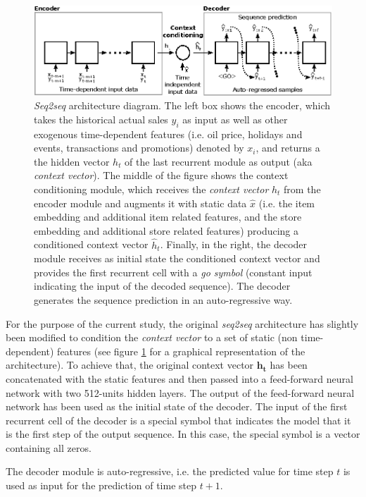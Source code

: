\documentclass{elsarticle}
\begin{document}
	\begin{figure}[h!]
		\centering
		\includegraphics[width=1\linewidth]{img/s2s}
		\caption{\textit{Seq2seq} architecture diagram. The left box shows the encoder, which takes the historical actual sales $y_i$ as input as well as other exogenous time-dependent features (i.e. oil price, holidays and events, transactions and promotions) denoted by $x_i$, and returns a the hidden vector $h_t$ of the last recurrent module as output (aka \textit{context vector}). The middle of the figure shows the context conditioning module, which receives the \textit{context vector} $h_t$ from the encoder module and augments it with static data $\hat{x}$ (i.e. the item embedding and additional item related features, and the store embedding and additional store related features) producing a conditioned context vector $\hat{h}_t$. Finally, in the right, the decoder module receives as initial state the conditioned context vector and provides the first recurrent cell with a \textit{go symbol} (constant input indicating the input of the decoded sequence). The decoder generates the sequence prediction in an auto-regressive way.}
		\label{fig:s2s}
	\end{figure}
	
   For the purpose of the current study, the original \textit{seq2seq} architecture has slightly been modified to condition the \textit{context vector} to a set of static (non time-dependent) features (see figure \ref{fig:s2s} for a graphical representation of the architecture). To achieve that, the original context vector $\mathbf{h_t}$ has been concatenated with the static features and then passed into a feed-forward neural network with two 512-units hidden layers. The output of the feed-forward neural network has been used as the initial state of the decoder. The input of the first recurrent cell of the decoder is a special symbol that indicates the model that it is the first step of the output sequence. In this case, the special symbol is a vector containing all zeros. 
   
   The decoder module is auto-regressive, i.e. the predicted value for time step $t$ is used as input for the prediction of time step $t+1$.
   
\end{document}
